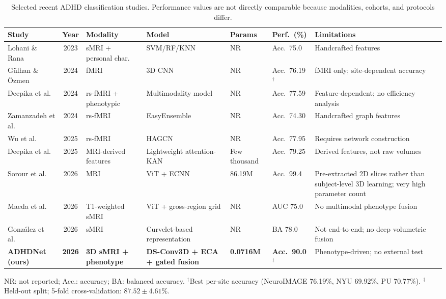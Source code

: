 \documentclass[runningheads]{llncs}
\begin{document}
\begin{table}[t]
\centering
\caption{Selected recent ADHD classification studies. Performance values are not directly comparable because modalities, cohorts, and protocols differ.}
\label{tab:literature}
{\scriptsize
\setlength{\tabcolsep}{2pt}
\begin{tabularx}{\textwidth}{@{}>{\raggedright\arraybackslash}p{1.75cm} c >{\raggedright\arraybackslash}p{1.45cm} >{\raggedright\arraybackslash}p{1.95cm} >{\raggedleft\arraybackslash}p{1.12cm} >{\raggedright\arraybackslash}p{1.15cm} Y@{}}
\toprule
Study & Year & Modality & Model & Params & Perf.\ (\%) & Limitations \\
\midrule
Lohani \& Rana~\cite{lohani2023} & 2023 & sMRI + personal char. & SVM/RF/KNN & NR & Acc.\ 75.0 & Handcrafted features \\
Gülhan \& Özmen~\cite{gulhan2025} & 2024 & fMRI & 3D CNN & NR & Acc.\ 76.19$^{\dagger}$ & fMRI only; site-dependent accuracy \\
Deepika et al.~\cite{deepika2024} & 2024 & rs-fMRI + phenotypic & Multimodality model & NR & Acc.\ 77.59 & Feature-dependent; no efficiency analysis \\
Zamanzadeh et al.~\cite{zamanzadeh2024} & 2024 & rs-fMRI & EasyEnsemble & NR & Acc.\ 74.30 & Handcrafted graph features \\
Wu et al.~\cite{wu2025hagcn} & 2025 & rs-fMRI & HAGCN & NR & Acc.\ 77.95 & Requires network construction \\
Deepika et al.~\cite{deepika2025} & 2025 & MRI-derived features & Lightweight attention-KAN & Few thousand & Acc.\ 79.25 & Derived features, not raw volumes \\
Sorour et al.~\cite{sorour2026} & 2026 & MRI & ViT + ECNN & 86.19M & Acc.\ 99.4 & Pre-extracted 2D slices rather than subject-level 3D learning; very high parameter count \\
Maeda et al.~\cite{maeda2026} & 2026 & T1-weighted sMRI & ViT + gross-region grid & NR & AUC 75.0 & No multimodal phenotype fusion \\
González et al.~\cite{gonzalez2026} & 2026 & sMRI & Curvelet-based representation & NR & BA 78.0 & Not end-to-end; no deep volumetric fusion \\
\textbf{ADHDNet (ours)} & \textbf{2026} & \textbf{3D sMRI + phenotype} & \textbf{DS-Conv3D + ECA + gated fusion} & \textbf{0.0716M} & \textbf{Acc.\ 90.0}$^{\ddagger}$ & Phenotype-driven; no external test \\
\bottomrule
\end{tabularx}}\par\vspace{2pt}
{\raggedright\scriptsize NR: not reported; Acc.: accuracy; BA: balanced accuracy. $^{\dagger}$Best per-site accuracy (NeuroIMAGE 76.19\%, NYU 69.92\%, PU 70.77\%). $^{\ddagger}$Held-out split; 5-fold cross-validation: $87.52\pm4.61\%$.\par}
\end{table}
\end{document}
